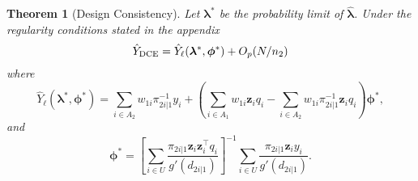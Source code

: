 \documentclass[12pt]{article}
\newtheorem{theorem}{Theorem}
\newcommand{\bx}{\mathbf{x}}
\renewcommand{\bf}[1]{\mathbf{#1}}
\begin{document}
\begin{theorem}[Design Consistency]\label{thm:dc1}
  Let $\bm \lambda^*$ be the probability limit of $\hat{\bm \lambda}$. 
  Under the regularity conditions stated in the appendix
  $$
  \hat Y_{\rm DCE} = \hat Y_\ell(\bm{\lambda}^*, \bm \phi^*) + O_p(N / n_2)
  $$
  where
  $$
  \hat Y_{\ell}(\bm \lambda^*, \bm \phi^*) = 
  \sum_{i \in A_2} w_{1i} \pi_{2i|1}^{-1} y_i
  + \left(\sum_{i \in A_1} w_{1i} \bf z_i q_i - 
  \sum_{i \in A_2} w_{1i} \pi_{2i|1}^{-1} \bf{z}_i q_i\right)\bm \phi^*,
  $$
  and
  $$
  \bm \phi^* = 
  \left[\sum_{i \in U} \frac{\pi_{2i|1}\bf z_i \bf z_i^\top q_i}{g'(d_{2i|1})}\right]^{-1}
  \sum_{i \in U} \frac{\pi_{2i|1}\bf z_i y_i}{g'(d_{2i|1})}.
  $$

%

\end{theorem}
\end{document}

